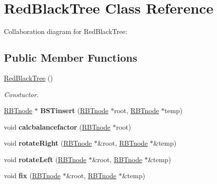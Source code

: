 \hypertarget{classRedBlackTree}{}\section{Red\+Black\+Tree Class Reference}
\label{classRedBlackTree}


Collaboration diagram for Red\+Black\+Tree\+:
\subsection*{Public Member Functions}
\begin{DoxyCompactItemize}
\item 
\mbox{\label{classRedBlackTree_a16706b7c753cf2d86514cda01840abd9}} 
\hyperlink{classRedBlackTree_a16706b7c753cf2d86514cda01840abd9}{Red\+Black\+Tree} ()
\begin{DoxyCompactList}\small\item\em Constuctor. \end{DoxyCompactList}\item 
\mbox{\label{classRedBlackTree_a5769de46e4a3d6a908bf636cd1ab5cbf}} 
\hyperlink{classRBTnode}{R\+B\+Tnode} $\ast$ {\bfseries B\+S\+Tinsert} (\hyperlink{classRBTnode}{R\+B\+Tnode} $\ast$root, \hyperlink{classRBTnode}{R\+B\+Tnode} $\ast$temp)
\item 
\mbox{\label{classRedBlackTree_a91cd12fd6b93fc93872a0adfd63963b1}} 
void {\bfseries calcbalancefactor} (\hyperlink{classRBTnode}{R\+B\+Tnode} $\ast$root)
\item 
\mbox{\label{classRedBlackTree_ae8ebcf36b0aab5844c91fad22afb0a82}} 
void {\bfseries rotate\+Right} (\hyperlink{classRBTnode}{R\+B\+Tnode} $\ast$\&root, \hyperlink{classRBTnode}{R\+B\+Tnode} $\ast$\&temp)
\item 
\mbox{\label{classRedBlackTree_abc8d1cd719fbe4afebf0c4a2e9bcca1b}} 
void {\bfseries rotate\+Left} (\hyperlink{classRBTnode}{R\+B\+Tnode} $\ast$\&root, \hyperlink{classRBTnode}{R\+B\+Tnode} $\ast$\&temp)
\item 
\mbox{\label{classRedBlackTree_a304bd2950d52ea75de9c8c3834724cf4}} 
void {\bfseries fix} (\hyperlink{classRBTnode}{R\+B\+Tnode} $\ast$\&root, \hyperlink{classRBTnode}{R\+B\+Tnode} $\ast$\&temp)

\end{DoxyCompactItemize}
